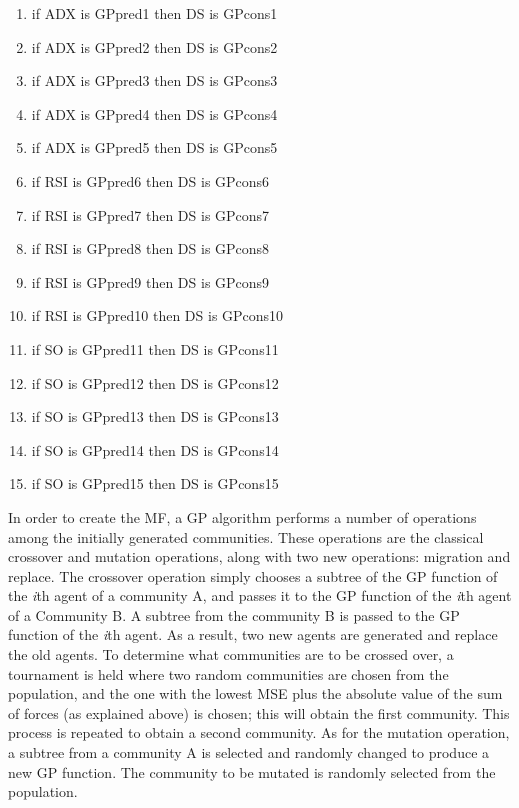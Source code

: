 \documentclass[a4paper,twoside]{article}
\begin{document}
\begin{enumerate}
\item if ADX is GPpred1 then DS is GPcons1
\item if ADX is GPpred2 then DS is GPcons2
\item if ADX is GPpred3 then DS is GPcons3
\item if ADX is GPpred4 then DS is GPcons4
\item if ADX is GPpred5 then DS is GPcons5

\item if RSI is GPpred6 then DS is GPcons6
\item if RSI is GPpred7 then DS is GPcons7
\item if RSI is GPpred8 then DS is GPcons8
\item if RSI is GPpred9 then DS is GPcons9
\item if RSI is GPpred10 then DS is GPcons10

\item if SO is GPpred11 then DS is GPcons11
\item if SO is GPpred12 then DS is GPcons12
\item if SO is GPpred13 then DS is GPcons13
\item if SO is GPpred14 then DS is GPcons14
\item if SO is GPpred15 then DS is GPcons15
\end{enumerate}


In order to create the MF, a GP algorithm performs a number of
operations among the initially generated communities. These operations
are the classical crossover and mutation operations, along with two
new operations: migration and replace. The crossover operation simply
chooses a subtree of the GP function of the \textit{i}th agent of a
community A, and passes it to the GP function of the \textit{i}th
agent of a Community B. A subtree from the community B is passed to
the GP function of the \textit{i}th agent. As a result, two new agents
are generated and replace the old agents. To determine what
communities are to be crossed over, a tournament is held where two
random communities are chosen from the population, and the one with
the lowest MSE plus the absolute value of the sum of forces (as
explained above)
is chosen; this will obtain the first community. This process is
repeated to obtain a second community. As for the mutation operation,
a subtree from a community A is selected and randomly changed to
produce a new GP function. The community to be mutated is randomly
selected from the population. %
\end{document}
